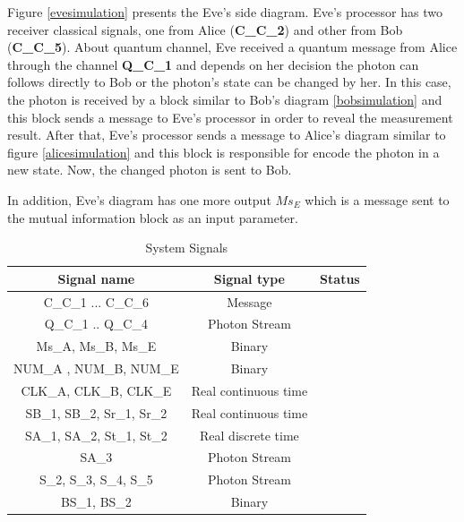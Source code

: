 Figure \ref{evesimulation} presents the Eve's side diagram. Eve's processor has two receiver classical signals, one from Alice (\textbf{C\_C\_2}) and other from Bob (\textbf{C\_C\_5}). About quantum channel, Eve received a quantum message from Alice through the channel \textbf{Q\_C\_1} and depends on her decision the photon can follows directly to Bob or the photon's state can be changed by her. In this case, the photon is received by a block similar to Bob's diagram \ref{bobsimulation} and this block sends a message to Eve's processor in order to reveal the measurement result. After that, Eve's processor sends a message to Alice's diagram similar to figure \ref{alicesimulation} and this block is responsible for encode the photon in a new state. Now, the changed photon is sent to Bob.

In addition, Eve's diagram has one more output $Ms_{E}$ which is a message sent to the mutual information block as an input parameter.

\begin{table}[hbt]
\centering
\caption{System Signals}
\label{tb:signals}
\begin{tabular}{|c|c|c|}
\hline
\textbf{Signal name}         & \textbf{Signal type} & \textbf{Status} \\ \hline
C\_C\_1 ... C\_C\_6          & Message              &                 \\ \hline
Q\_C\_1 .. Q\_C\_4           & Photon Stream        &                 \\ \hline
Ms\_A, Ms\_B, Ms\_E          & Binary               &                 \\ \hline
NUM\_A , NUM\_B, NUM\_E      & Binary               &                 \\ \hline
CLK\_A, CLK\_B, CLK\_E       & Real continuous time &                 \\ \hline
SB\_1, SB\_2, Sr\_1, Sr\_2   & Real continuous time &                 \\ \hline
SA\_1, SA\_2, St\_1, St\_2   & Real discrete time   &                 \\ \hline
SA\_3                        & Photon  Stream       &                 \\ \hline
S\_2, S\_3, S\_4, S\_5       & Photon Stream        &                 \\ \hline
BS\_1, BS\_2                 & Binary               &                 \\ \hline
\end{tabular}
\end{table}

